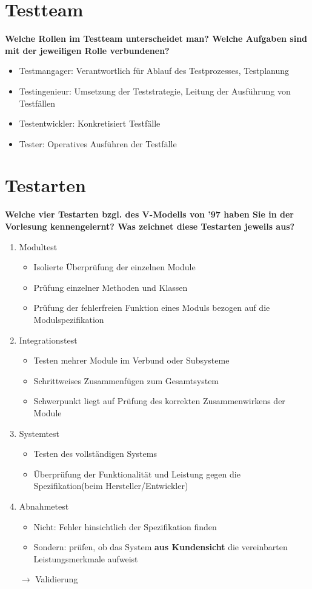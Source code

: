 \section{Testteam}
\textbf{Welche Rollen im Testteam unterscheidet man? Welche Aufgaben sind mit der jeweiligen Rolle verbundenen?}
\begin{itemize}
    \item Testmangager: Verantwortlich für Ablauf des Testprozesses, Testplanung
    \item Testingenieur: Umsetzung der Teststrategie, Leitung der Ausführung von Testfällen
    \item Testentwickler: Konkretisiert Testfälle
    \item Tester: Operatives Ausführen der Testfälle
\end{itemize}

\section{Testarten}
\textbf{Welche vier Testarten bzgl. des V-Modells von '97 haben Sie in der Vorlesung kennengelernt? Was zeichnet diese Testarten jeweils aus?}
\begin{enumerate}
    \item Modultest\begin{itemize}
              \item Isolierte Überprüfung der einzelnen Module
              \item Prüfung einzelner Methoden und Klassen
              \item Prüfung der fehlerfreien Funktion eines Moduls bezogen auf die Modulspezifikation
          \end{itemize}
    \item Integrationstest\begin{itemize}
              \item Testen mehrer Module im Verbund oder Subsysteme
              \item Schrittweises Zusammenfügen zum Gesamtsystem
              \item Schwerpunkt liegt auf Prüfung des korrekten Zusammenwirkens der Module
          \end{itemize}
    \item Systemtest\begin{itemize}
              \item Testen des vollständigen Systems
              \item Überprüfung der Funktionalität und Leistung gegen die Spezifikation(beim Hersteller/Entwickler)
          \end{itemize}
    \item Abnahmetest\begin{itemize}
              \item Nicht: Fehler hinsichtlich der Spezifikation finden
              \item Sondern: prüfen, ob das System \textbf{aus Kundensicht} die vereinbarten Leistungsmerkmale aufweist
          \end{itemize}
          $\rightarrow$ Validierung
\end{enumerate}

